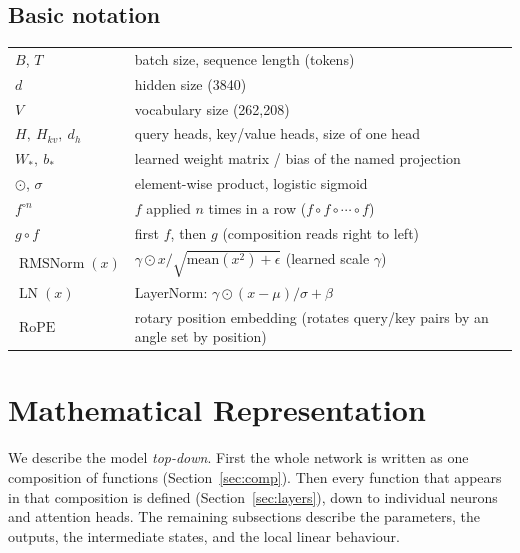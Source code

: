 \documentclass[10pt,a4paper]{article}
\newcommand{\op}[1]{\operatorname{#1}}
\theoremstyle{definition}
\begin{document}
\subsection*{Basic notation}
\begin{tabular}{ll}
\toprule
$B$, $T$ & batch size, sequence length (tokens) \\
$d$ & hidden size (3840) \\
$V$ & vocabulary size (262,208) \\
$H,\ H_{kv},\ d_h$ & query heads, key/value heads, size of one head \\
$W_\ast,\ b_\ast$ & learned weight matrix / bias of the named projection \\
$\odot$, $\sigma$ & element-wise product, logistic sigmoid \\
$f^{\circ n}$ & $f$ applied $n$ times in a row ($f\circ f\circ\cdots\circ f$) \\
$g \circ f$ & first $f$, then $g$ (composition reads right to left) \\
$\op{RMSNorm}(x)$ & $\gamma \odot x / \sqrt{\mathrm{mean}(x^2)+\epsilon}$ (learned scale $\gamma$) \\
$\op{LN}(x)$ & LayerNorm: $\gamma\odot(x-\mu)/\sigma + \beta$ \\
$\op{RoPE}$ & rotary position embedding (rotates query/key pairs by an angle set by position) \\
\bottomrule
\end{tabular}
\section{Mathematical Representation}\label{sec:func}
We describe the model \emph{top-down}. First the whole network is written as one composition of functions (Section~\ref{sec:comp}). Then every function that appears in that composition is defined (Section~\ref{sec:layers}), down to individual neurons and attention heads. The remaining subsections describe the parameters, the outputs, the intermediate states, and the local linear behaviour.
\end{document}
